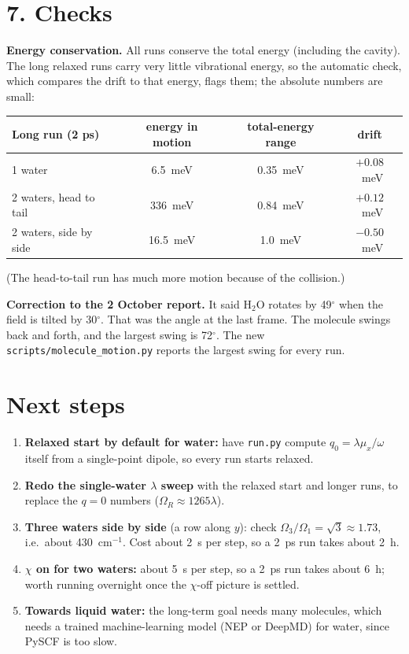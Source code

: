 \documentclass[11pt]{article}
\newcommand{\cm}{~cm$^{-1}$}
\begin{document}
\section*{7. Checks}

\textbf{Energy conservation.} All runs conserve the total energy (including the cavity).
The long relaxed runs carry very little vibrational energy, so the automatic check, which
compares the drift to that energy, flags them; the absolute numbers are small:

\begin{table}[H]
\centering\small
\begin{tabular}{lccc}
\toprule
Long run (2 ps) & energy in motion & total-energy range & drift\\
\midrule
1 water                    & 6.5~meV  & 0.35~meV & $+0.08$~meV\\
2 waters, head to tail     & 336~meV  & 0.84~meV & $+0.12$~meV\\
2 waters, side by side     & 16.5~meV & 1.0~meV  & $-0.50$~meV\\
\bottomrule
\end{tabular}
\end{table}

(The head-to-tail run has much more motion because of the collision.)

\textbf{Correction to the 2 October report.} It said H$_2$O rotates by 49$^\circ$ when
the field is tilted by 30$^\circ$. That was the angle at the last frame. The molecule
swings back and forth, and the largest swing is 72$^\circ$. The new
\texttt{scripts/molecule\_motion.py} reports the largest swing for every run.

\section*{Next steps}

\begin{enumerate}
  \item \textbf{Relaxed start by default for water:} have \texttt{run.py} compute
        $q_0=\lambda\mu_x/\omega$ itself from a single-point dipole, so every run starts
        relaxed.
  \item \textbf{Redo the single-water $\lambda$ sweep} with the relaxed start and longer
        runs, to replace the $q=0$ numbers ($\Omega_R \approx 1265\lambda$).
  \item \textbf{Three waters side by side} (a row along $y$): check
        $\Omega_3/\Omega_1 = \sqrt3 \approx 1.73$, i.e.\ about 430\cm. Cost about
        2~s per step, so a 2~ps run takes about 2~h.
  \item \textbf{$\chi$ on for two waters:} about 5~s per step, so a 2~ps run takes about
        6~h; worth running overnight once the $\chi$-off picture is settled.
  \item \textbf{Towards liquid water:} the long-term goal needs many molecules, which needs
        a trained machine-learning model (NEP or DeepMD) for water, since PySCF is too slow.
\end{enumerate}
\end{document}
